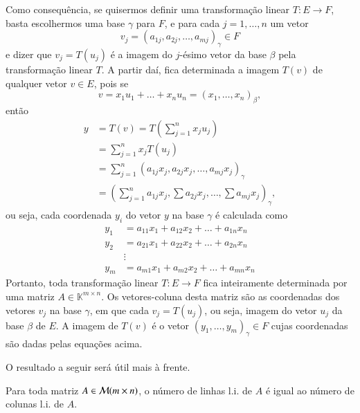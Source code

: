 Como consequência, se quisermos definir uma transformação linear $T:E \to F$, basta escolhermos uma base $\gamma$ para $F$, e para cada $j=1,\ldots,n$ um vetor 
\begin{equation*}
  v_j=(a_{1j},a_{2j},\ldots,a_{mj})_{\gamma} \in F
\end{equation*}
e dizer que $v_j = T(u_j)$ é a imagem do $j$-ésimo vetor da base $\beta$ pela transformação linear $T$. A partir daí, fica determinada a imagem $T(v)$ de qualquer vetor $v\in E$, pois se 
\begin{equation*}
  v=x_1u_1+\ldots+x_nu_n = (x_1,\ldots,x_n)_{\beta},
\end{equation*}
então
\begin{align*}
    y &= T(v) = T\left(\sum_{j=1}^n x_ju_j\right)\\
    &= \sum_{j=1}^n x_jT(u_j) \\
    &= \sum_{j=1}^n \left( a_{1j}x_j,a_{2j}x_j,\ldots,a_{mj}x_j\right)_{\gamma} \\
    &= \left( \sum_{j=1}^n a_{1j}x_j,\sum a_{2j}x_j,\ldots,\sum a_{mj}x_j \right)_{\gamma},
\end{align*}
ou seja, cada coordenada $y_i$ do vetor $y$ na base $\gamma$ é calculada como
\begin{align*}
    y_1 &= a_{11}x_1 + a_{12}x_2 + \ldots + a_{1n}x_n\\
    y_2 &= a_{21}x_1 + a_{22}x_2 + \ldots + a_{2n}x_n\\
        & \vdots  \\
    y_m &= a_{m1}x_1 + a_{m2}x_2 + \ldots + a_{mn}x_n
\end{align*}
Portanto, toda transformação linear $T:E \to F$ fica inteiramente determinada por uma matriz $A\in {\mathbb{K}}^{m\times n}$. Os vetores-coluna desta matriz são as coordenadas dos vetores $v_j$ na base $\gamma$, em que cada $v_j=T(u_j)$, ou seja, imagem do vetor $u_j$ da base $\beta$ de $E$. A imagem de $T(v)$ é o vetor $(y_1,\ldots,y_m)_{\gamma}\in F$ cujas coordenadas são dadas pelas equações acima.

O resultado a seguir será útil mais à frente.

\begin{teo}
  Para toda matriz $A\in {\cal{M}}(m\times n)$, o número de linhas l.i. de $A$ é igual ao número de colunas l.i. de $A$.
\end{teo}

